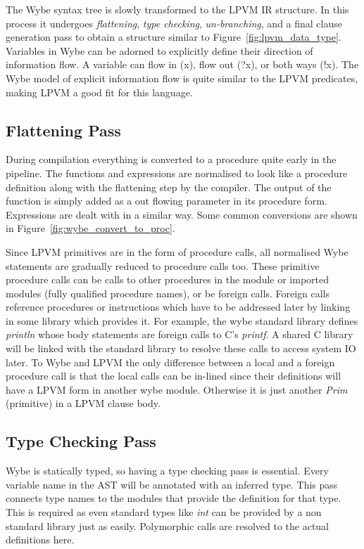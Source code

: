 The Wybe syntax tree is slowly transformed to the LPVM IR structure. In this
process it undergoes \textit{flattening}, \textit{type checking},
\textit{un-branching}, and a final clause generation pass to obtain a structure
similar to Figure~\ref{fig:lpvm_data_type}. Variables in Wybe can be adorned to
explicitly define their direction of information flow. A variable can flow in
(x), flow out (?x), or both ways (!x). The Wybe model of explicit information
flow is quite similar to the LPVM predicates, making LPVM a good fit for this
language. 

\subsection{Flattening Pass}

During compilation everything is converted to a procedure quite early
in the pipeline. The functions and expressions are normalised to look like a
procedure definition along with the flattening step by the compiler. The output
of the function is simply added as a out flowing parameter in its procedure
form. Expressions are dealt with in a similar way.  Some common conversions are
shown in Figure~\ref{fig:wybe_convert_to_proc}.

Since LPVM primitives are in the form of procedure calls, all normalised Wybe
statements are gradually reduced to procedure calls too. These primitive
procedure calls can be calls to other procedures in the module or imported
modules (fully qualified procedure names), or be foreign calls. Foreign calls
reference procedures or instructions which have to be addressed later by
linking in some library which provides it. For example, the wybe standard
library defines \textit{println} whose body statements are foreign calls to C's
\textit{printf}. A shared C library will be linked with the standard library to
resolve these calls to access system IO later. To Wybe and LPVM the only
difference between a local and a foreign procedure call is that the local calls
can be in-lined since their definitions will have a LPVM form in another wybe
module. Otherwise it is just another \textit{Prim} (primitive) in a LPVM clause
body.

\subsection{Type Checking Pass}

Wybe is statically typed, so having a type checking pass is essential. Every
variable name in the AST will be annotated with an inferred type. This pass
connects type names to the modules that provide the definition for that
type. This is required as even standard types like \textit{int} can be provided
by a non standard library just as easily. Polymorphic calls are resolved to the
actual definitions here.


